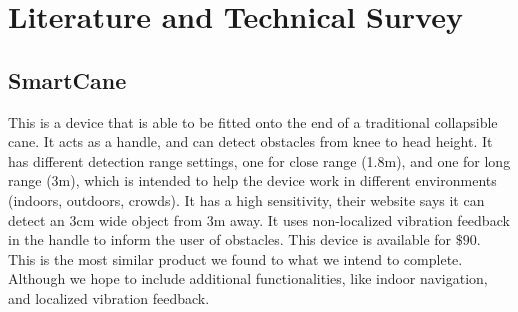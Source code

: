 \documentclass[letterpaper,12pt]{article}
\begin{document}

\section{Literature and Technical Survey}
\subsection {SmartCane}
This is a device that is able to be fitted onto the end of a traditional collapsible cane. It acts as a handle, and can detect obstacles from knee to head height. It has different detection range settings, one for close range (1.8m),  and one for long range (3m), which is intended to help the device work in different environments (indoors, outdoors, crowds). It has a high sensitivity, their website says it can detect an 3cm wide object from 3m away. It uses non-localized vibration feedback in the handle to inform the user of obstacles. This device is available for $ \$90$. This is the most similar product we found to what we intend to complete. Although we hope to include additional functionalities, like indoor navigation, and localized vibration feedback. \cite{SmartCane}
\end{document}
